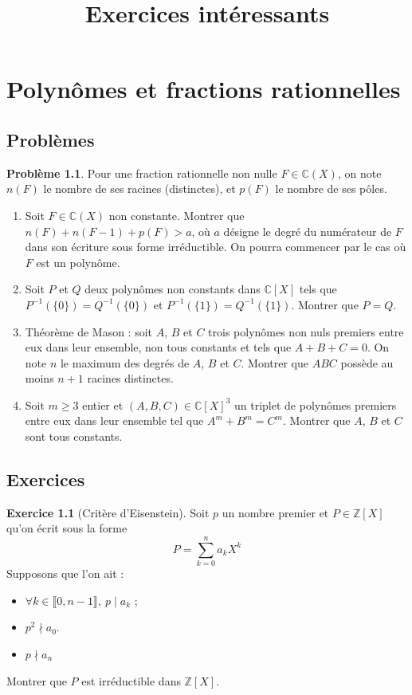 \documentclass[french]{book}
\title{Exercices intéressants}
\newcommand{\Z}{\mathbb{Z}}
\newcommand{\C}{\mathbb{C}}
\newcommand{\inv}{^{-1}}
\theoremstyle{definition}
\newtheorem{ex}{Exercice}[chapter]
\newtheorem{pro}{Problème}[chapter]
\theoremstyle{remark}
\begin{document}
\chapter{Polynômes et fractions rationnelles}

\section{Problèmes}

\begin{pro}
	Pour une fraction rationnelle non nulle $F\in\C(X)$, on note $n(F)$ le nombre de ses racines (distinctes), et $p(F)$ le nombre de ses pôles.
	\begin{enumerate}
		\item Soit $F\in\C(X)$ non constante. Montrer que $n(F)+n(F-1)+p(F)>a$, où $a$ désigne le degré du numérateur de $F$ dans son écriture sous forme irréductible. On pourra commencer par le cas où $F$ est un polynôme.
		\item Soit $P$ et $Q$ deux polynômes non constants dans $\C[X]$ tels que $P\inv(\{0\})=Q\inv(\{0\})$ et $P\inv(\{1\})=Q\inv(\{1\})$. Montrer que $P=Q$.
		\item Théorème de Mason : soit $A$, $B$ et $C$ trois polynômes non nuls premiers entre eux dans leur ensemble, non tous constants et tels que $A+B+C=0$. On note $n$ le maximum des degrés de $A$, $B$ et $C$. Montrer que $ABC$ possède au moins $n+1$ racines distinctes.
		\item Soit $m\geqslant 3$ entier et $(A,B,C)\in\C[X]^3$ un triplet de polynômes premiers entre eux dans leur ensemble tel que $A^m+B^m=C^m$. Montrer que $A$, $B$ et $C$ sont tous constants.
	\end{enumerate}
\end{pro}

\section{Exercices}

\begin{ex}[Critère d'Eisenstein]
	Soit $p$ un nombre premier et $P\in\Z[X]$ qu'on écrit sous la forme $$P=\sum_{k=0}^{n}a_kX^k$$ Supposons que l'on ait :
	\begin{itemize}
		\item $\forall k\in\llbracket0,n-1\rrbracket,\ p\mid a_k$ ;
		\item $p^2\nmid a_0$.
		\item $p\nmid a_n$
	\end{itemize}
	Montrer que $P$ est irréductible dans $\Z[X]$.
\end{ex}
\end{document}
